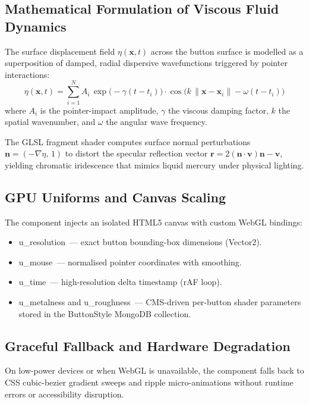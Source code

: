 \documentclass[12pt, a4paper, oneside]{report}
\def\texttt#1{#1}
\def\&{and}
\begin{document}
\subsection{Mathematical Formulation of Viscous Fluid Dynamics}

The surface displacement field $\eta(\mathbf{x}, t)$ across the button surface
is modelled as a superposition of damped, radial dispersive wavefunctions
triggered by pointer interactions:
\begin{equation}
  \eta(\mathbf{x},t) =
    \sum_{i=1}^{N} A_i \,
    \exp\!\bigl(-\gamma(t-t_i)\bigr)
    \cdot
    \cos\!\bigl(k\,\|\mathbf{x}-\mathbf{x}_i\| - \omega(t-t_i)\bigr)
\end{equation}
where $A_i$ is the pointer-impact amplitude, $\gamma$ the viscous damping
factor, $k$ the spatial wavenumber, and $\omega$ the angular wave frequency.

The GLSL fragment shader computes surface normal perturbations
$\mathbf{n} = (-\nabla\eta,\,1)$ to distort the specular reflection vector
$\mathbf{r} = 2(\mathbf{n}\cdot\mathbf{v})\mathbf{n} - \mathbf{v}$, yielding
chromatic iridescence that mimics liquid mercury under physical lighting.

\subsection{GPU Uniforms \& Canvas Scaling}

The component injects an isolated HTML5 canvas with custom WebGL bindings:
\begin{itemize}
  \item \texttt{u\_resolution}\ --- exact button bounding-box dimensions (Vector2).
  \item \texttt{u\_mouse}\ --- normalised pointer coordinates with smoothing.
  \item \texttt{u\_time}\ --- high-resolution delta timestamp (rAF loop).
  \item \texttt{u\_metalness} \& \texttt{u\_roughness}\ --- CMS-driven per-button
        shader parameters stored in the \texttt{ButtonStyle} MongoDB collection.
\end{itemize}

\subsection{Graceful Fallback \& Hardware Degradation}

On low-power devices or when WebGL is unavailable, the component falls back
to CSS cubic-bezier gradient sweeps and ripple micro-animations without
runtime errors or accessibility disruption.
\end{document}
